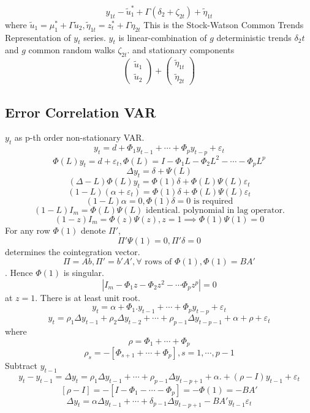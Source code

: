 \documentclass[11pt, a4paper, oneside]{article}
\theoremstyle{definition}
\theoremstyle{proposition}
\theoremstyle{corollary}
\theoremstyle{lemma}
\theoremstyle{theorem}
\begin{document}
$$y_{1t} - \tilde{u}_1^* + \Gamma(\delta_2+ \zeta_{2t})+ \tilde{\eta}_{1t}$$  
where $\tilde{u}_1 = \mu_1^* + \Gamma \tilde{u}_2, \tilde{\eta}_{1t} = z_t^* + \Gamma \eta_{2t}$
This is the Stock-Watson Common Trends Representation of $y_t$ series. $y_t$ is linear-combination of $g$ deterministic trends $\delta_2 t$ and $g$ common random walks $\zeta_{2t}$. and stationary components $$\begin{pmatrix}\tilde{u}_1 \\ \tilde{u}_2 \end{pmatrix}+ \begin{pmatrix}\tilde{\eta}_{1t} \\ \tilde{\eta}_{2t} \end{pmatrix}$$

\subsection{Error Correlation VAR}
$y_t$ as p-th order non-stationary VAR. 
$$y_{t} = d + \Phi_1 y_{t-1} + \cdots + \Phi_p y_{t-p} + \varepsilon_t$$
$$\Phi(L) y_t = d + \varepsilon_t, \Phi(L) = I-\Phi_1 L - \Phi_2 L^2 - \cdots - \Phi_p L^p$$
$$\Delta y_t = \delta + \Psi(L)$$ 
$$(\Delta - L) \Phi(L) y_t = \Phi(1)\delta + \Phi(L) \Psi(L)\varepsilon_t$$
$$(1 -L) (\alpha + \varepsilon_t) = \Phi(1) \delta + \Phi(L)\Psi(L)\varepsilon_t$$
$$(1- L)\alpha = 0, \Phi(1)\delta = 0 \text{ is required} $$
$$(1- L) I_m = \Phi(L) \Psi(L) \text{ identical. polynomial in lag operator.}$$ 
$$(1-z)I_m = \Phi(z)\Psi(z), z = 1\implies \Phi(1)\Psi(1) = 0$$
For any row $\Phi(1)$ denote $\Pi'$, $$\Pi' \Psi(1) = 0, \Pi'\delta = 0$$ determines the cointegration vector. 
$$\Pi = A b, \Pi' = b'A', \forall \text{ rows of } \Phi(1), \Phi(1) = BA'$$. Hence $\Phi(1)$ is singular. 
$$| I_m - \Phi_1 z   - \Phi_2 z^2 -  \cdots \Phi_p z^p| = 0$$ at $z= 1$. There is at least unit root. 
$$y_t =\alpha + \Phi_1. y_{t-1} + \cdots + \Phi_p y_{t-p} + \varepsilon_t$$ 
$$y_t = \rho_1 \Delta y_{t-1} + \rho_2\Delta y_{t-2} + \cdots + \rho_{p-1} \Delta y_{t-p-1} + \alpha + \rho + \varepsilon_t$$
where $$\rho = \Phi_1 +\cdots + \Phi_p$$
$$\rho_s = -[\Phi_{s+1} +\cdots + \Phi_p] , s = 1, \cdots, p-1$$
Subtract $y_{t-1}$
$$y_t - y_{t-1} = \Delta y_t = \rho_1 \Delta y_{t-1} + \cdots + \rho_{p-1} \Delta y_{t-p+1} + \alpha.+ (\rho -I)y_{t-1} + \varepsilon_t$$
$$[\rho - I] = -[I - \Phi_1-\cdots-\Phi_p] = -\Phi(1) = - BA'$$
$$\Delta y_t = \alpha \Delta y_{t-1}+\cdots + \delta_{p-1} \Delta y_{t-p+1} - BA' y_{t-1} \varepsilon_t$$
\end{document}
